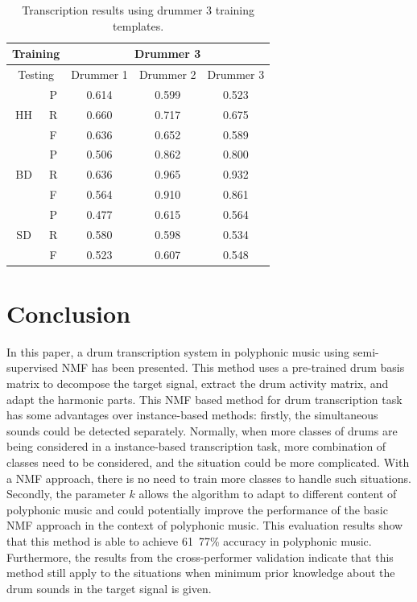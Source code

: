 \documentclass{article}
\begin{document}
\begin{table}[h]
\begin{center}
\begin{tabular}{|c|c|c|c|c|}
\hline
\multicolumn{2}{|c}{Training} & \multicolumn{3}{|c|}{Drummer 3}   \\ \hline
\multicolumn{2}{|c|}{Testing} & Drummer 1 & Drummer 2 & Drummer 3 \\ \hline
\multirow{3}{*}{HH}    & P    & 0.614     & 0.599     & 0.523     \\ \cline{2-5} 
                       & R    & 0.660     & 0.717     & 0.675     \\ \cline{2-5} 
                       & F    & 0.636     & 0.652     & 0.589     \\ \hline
\multirow{3}{*}{BD}    & P    & 0.506     & 0.862     & 0.800     \\ \cline{2-5} 
                       & R    & 0.636     & 0.965     & 0.932     \\ \cline{2-5} 
                       & F    & 0.564     & 0.910     & 0.861     \\ \hline
\multirow{3}{*}{SD}    & P    & 0.477     & 0.615     & 0.564     \\ \cline{2-5} 
                       & R    & 0.580     & 0.598     & 0.534     \\ \cline{2-5} 
                       & F    & 0.523     & 0.607     & 0.548     \\ \hline
\end{tabular}
 \caption{Transcription results using drummer 3 training templates.}
 \label{tab:trainDr3}
\end{center}
\end{table}

\section{Conclusion}\label{sec:Conclusion}

In this paper, a drum transcription system in polyphonic music using semi-supervised NMF has been presented. This method uses a pre-trained drum basis matrix to decompose the target signal, extract the drum activity matrix, and adapt the harmonic parts. This NMF based method for drum transcription task has some advantages over instance-based methods: firstly, the simultaneous sounds could be detected separately. Normally, when more classes of drums are being considered in a instance-based transcription task, more combination of classes need to be considered, and the situation could be more complicated. With a NMF approach, there is no need to train more classes to handle such situations. Secondly, the parameter $k$ allows the algorithm to adapt to different content of polyphonic music and could potentially improve the performance of the basic NMF approach in the context of polyphonic music. This evaluation results show that this method is able to achieve 61~77\% accuracy in polyphonic music. Furthermore, the results from the cross-performer validation indicate that this method still apply to the situations when minimum prior knowledge about the drum sounds in the target signal is given.
\end{document}
